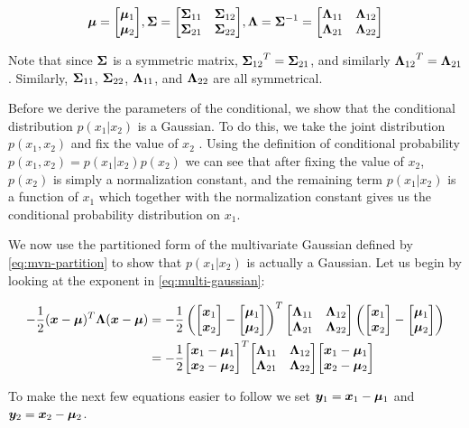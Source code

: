 \begin{equation}
    \vmu = \partmu,
    \mSigma = \partsigma, \mLambda = \mSigma^{-1} = \partlambda \label{eq:mvn-partition}
\end{equation}

Note that since $\mSigma$ is a symmetric matrix, $\ms{12}^T = \ms{21}$, and similarly $\ml{12}^T = \ml{21}$. Similarly, $\ms{11}$, $\ms{22}$, $\ml{11}$, and $\ml{22}$ are all symmetrical.

Before we derive the parameters of the conditional, we show that the conditional distribution $p(x_1 | x_2)$ is a Gaussian. To do this, we take the joint distribution $p(x_1, x_2)$ and fix the value of $x_2$ \citep{bishop2016pattern}. Using the definition of conditional probability $p(x_1, x_2) = p(x_1 | x_2) p(x_2)$ we can see that after fixing the value of $x_2$, $p(x_2)$ is simply a normalization constant, and the remaining term $p(x_1 | x_2)$ is a function of $x_1$ which together with the normalization constant gives us the conditional probability distribution on $x_1$.

We now use the partitioned form of the multivariate Gaussian defined by \eqref{eq:mvn-partition} to show that $p(x_1 | x_2)$ is actually a Gaussian. Let us begin by looking at the exponent in \eqref{eq:multi-gaussian}:

\begin{align}
    -\frac{1}{2} (\vx - \vmu)^T \mLambda (\vx - \vmu) &= 
    -\frac{1}{2} \left(\partx - \partmu \right)^T \partlambda \left(\partx - \partmu \right) \\
    &= -\frac{1}{2} \partxmu^T \partlambda \partxmu
\end{align}

To make the next few equations easier to follow we set $\vy_1 = \vx_1 - \vmu_1$ and $\vy_2 = \vx_2 - \vmu_2$.

